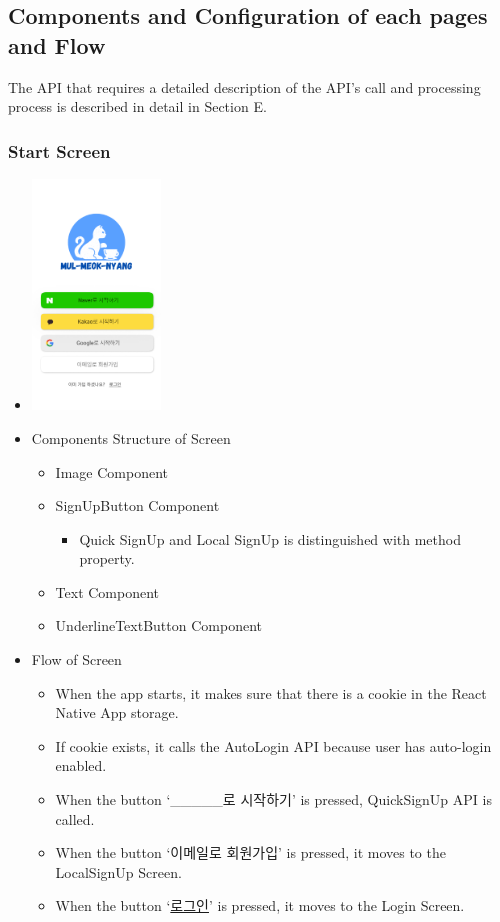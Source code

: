 \documentclass[conference]{IEEEtran}
\begin{document}
\subsection{Components and Configuration of each pages and Flow}
The API that requires a detailed description of the API's call and processing process is described in detail in Section E.

\subsubsection{Start Screen}
\begin{itemize}
    \item[] \includegraphics[width=0.27\textwidth]{img/D/1.png}
    \item Components Structure of Screen
    \begin{itemize}
        \item Image Component
        \item SignUpButton Component
        \begin{itemize}
            \item Quick SignUp and Local SignUp is distinguished with method property.
        \end{itemize}
        \item Text Component
        \item UnderlineTextButton Component
    \end{itemize}
    \item Flow of Screen
    \begin{itemize}
        \item When the app starts, it makes sure that there is a cookie in the React Native App storage.
        \item If cookie exists, it calls the AutoLogin API because user has auto-login enabled.
        \item When the button ‘\_\_\_\_\_로 시작하기’ is pressed, QuickSignUp API is called.
        \item When the button ‘이메일로 회원가입’ is pressed, it moves to the LocalSignUp Screen.
        \item When the button ‘\underline{로그인}’ is pressed, it moves to the Login Screen. 
        \\
    \end{itemize}
\end{itemize}
\newpage
\end{document}

